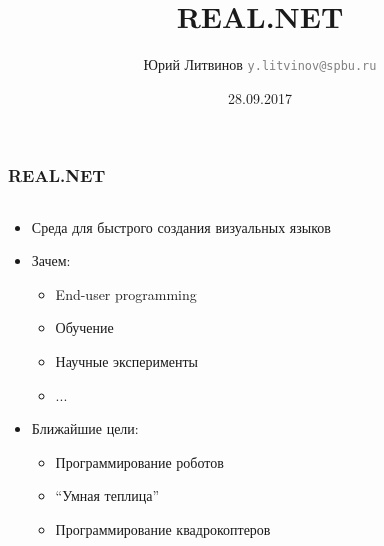 \documentclass[xetex,mathserif,serif]{beamer}
\title{REAL.NET}
\author[Юрий Литвинов]{Юрий Литвинов \newline 
	\textcolor{gray}{\small\texttt{y.litvinov@spbu.ru}}
}
\date{28.09.2017}
\begin{document}
	\begin{frame}
		\frametitle{REAL.NET}
		\begin{columns}
			\begin{column}{0.5\textwidth}
				\begin{itemize}
					\item Среда для быстрого создания визуальных языков
					\item Зачем:
					\begin{itemize}
						\item End-user programming
						\item Обучение
						\item Научные эксперименты
						\item ...
					\end{itemize}
					\item Ближайшие цели:
					\begin{itemize}
						\item Программирование роботов
						\item ``Умная теплица''
						\item Программирование квадрокоптеров
					\end{itemize}
				\end{itemize}
			\end{column}
			\begin{column}{0.5\textwidth}
			\end{column}
		\end{columns}
	\end{frame}
\end{document}
